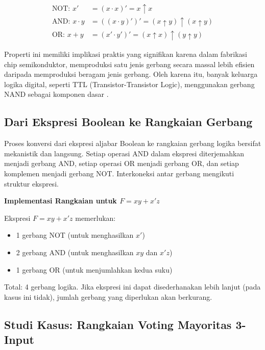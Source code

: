 \begin{align*}
\text{NOT: } x' &= (x \cdot x)' = x \uparrow x \\
\text{AND: } x \cdot y &= ((x \cdot y)')' = (x \uparrow y) \uparrow (x \uparrow y) \\
\text{OR: } x + y &= (x' \cdot y')' = (x \uparrow x) \uparrow (y \uparrow y)
\end{align*}

Properti ini memiliki implikasi praktis yang signifikan karena dalam fabrikasi chip semikonduktor, memproduksi satu jenis gerbang secara massal lebih efisien daripada memproduksi beragam jenis gerbang. Oleh karena itu, banyak keluarga logika digital, seperti TTL (Transistor-Transistor Logic), menggunakan gerbang NAND sebagai komponen dasar \cite{allaboutcircuits_gates}.

\subsection{Dari Ekspresi Boolean ke Rangkaian Gerbang}

Proses konversi dari ekspresi aljabar Boolean ke rangkaian gerbang logika bersifat mekanistik dan langsung. Setiap operasi AND dalam ekspresi diterjemahkan menjadi gerbang AND, setiap operasi OR menjadi gerbang OR, dan setiap komplemen menjadi gerbang NOT. Interkoneksi antar gerbang mengikuti struktur ekspresi.

\begin{contoh}
\textbf{Implementasi Rangkaian untuk $F = xy + x'z$}

Ekspresi $F = xy + x'z$ memerlukan:
\begin{itemize}
    \item 1 gerbang NOT (untuk menghasilkan $x'$)
    \item 2 gerbang AND (untuk menghasilkan $xy$ dan $x'z$)
    \item 1 gerbang OR (untuk menjumlahkan kedua suku)
\end{itemize}

Total: 4 gerbang logika. Jika ekspresi ini dapat disederhanakan lebih lanjut (pada kasus ini tidak), jumlah gerbang yang diperlukan akan berkurang.
\end{contoh}

\subsection{Studi Kasus: Rangkaian Voting Mayoritas 3-Input}

